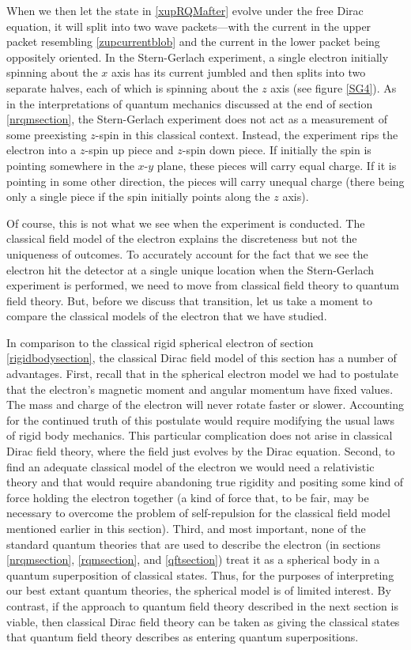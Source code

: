 \documentclass[12pt,secnumarabic,amsmath,amssymb,balancelastpage,nofootinbib]{article}
\begin{document}
When we then let the state in \eqref{xupRQMafter} evolve under the free Dirac equation, it will split into two wave packets---with the current in the upper packet resembling \eqref{zupcurrentblob} and the current in the lower packet being oppositely oriented.  In the Stern-Gerlach experiment, a single electron initially spinning about the $x$ axis has its current jumbled and then splits into two separate halves, each of which is spinning about the $z$ axis (see figure \ref{SG4}).  As in the interpretations of quantum mechanics discussed at the end of section \ref{nrqmsection}, the Stern-Gerlach experiment does not act as a measurement of some preexisting $z$-spin in this classical context.  Instead, the experiment rips the electron into a $z$-spin up piece and $z$-spin down piece.  If initially the spin is pointing somewhere in the $x$-$y$ plane, these pieces will carry equal charge.  If it is pointing in some other direction, the pieces will carry unequal charge (there being only a single piece if the spin initially points along the $z$ axis).

Of course, this is not what we see when the experiment is conducted.  The classical field model of the electron explains the discreteness but not the uniqueness of outcomes.  To accurately account for the fact that we see the electron hit the detector at a single unique location when the Stern-Gerlach experiment is performed, we need to move from classical field theory to quantum field theory.  But, before we discuss that transition, let us take a moment to compare the classical models of the electron that we have studied.

In comparison to the classical rigid spherical electron of section \ref{rigidbodysection}, the classical Dirac field model of this section has a number of advantages.  First, recall that in the spherical electron model we had to postulate that the electron's magnetic moment and angular momentum have fixed values.  The mass and charge of the electron will never rotate faster or slower.  Accounting for the continued truth of this postulate would require modifying the usual laws of rigid body mechanics.  This particular complication does not arise in classical Dirac field theory, where the field just evolves by the Dirac equation.  Second, to find an adequate classical model of the electron we would need a relativistic theory and that would require abandoning true rigidity and positing some kind of force holding the electron together (a kind of force that, to be fair, may be necessary to overcome the problem of self-repulsion for the classical field model mentioned earlier in this section).  Third, and most important, none of the standard quantum theories that are used to describe the electron (in sections \ref{nrqmsection}, \ref{rqmsection}, and \ref{qftsection}) treat it as a spherical body in a quantum superposition of classical states.  Thus, for the purposes of interpreting our best extant quantum theories, the spherical model is of limited interest.  By contrast, if the approach to quantum field theory described in the next section is viable, then classical Dirac field theory can be taken as giving the classical states that quantum field theory describes as entering quantum superpositions.
\end{document}
